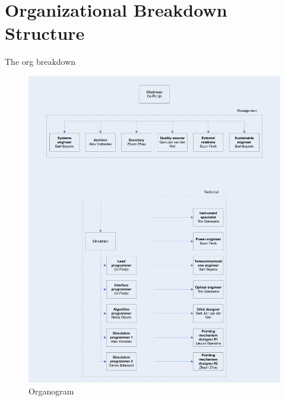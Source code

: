 \section{Organizational Breakdown Structure}
\label{dsePPOBS}
The org breakdown

\newpage
\begin{center}
\begin{figure}[H]
\includegraphics[width=1.2\textwidth]{chapters/img/Organogram.jpg}
\caption{Organogram}
\end{figure}
\end{center}